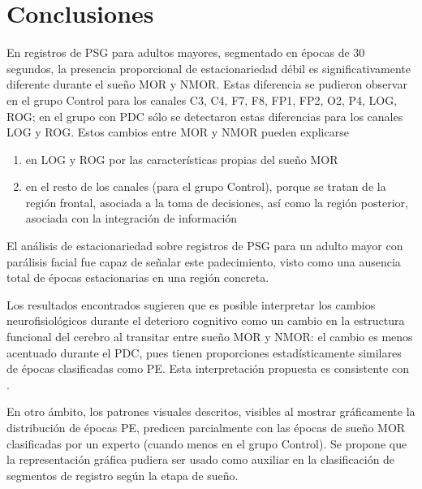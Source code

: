 \documentclass[12pt,a4paper]{mitthesis}
\begin{document}

\section{Conclusiones}

En registros de PSG para adultos mayores, segmentado en \'epocas de 30 segundos, la presencia 
proporcional de estacionariedad d\'ebil es significativamente diferente durante el sue\~no MOR y 
NMOR.
Estas diferencia se pudieron observar en el grupo Control para los canales C3, C4, F7, F8, FP1, 
FP2, O2, P4, LOG, ROG; en el grupo con PDC s\'olo se detectaron estas diferencias para los canales 
LOG y ROG.
Estos cambios entre MOR y NMOR pueden explicarse 
\begin{enumerate}
\item en LOG y ROG por las caracter\'isticas propias  del sue\~no MOR
\item en el resto de los canales (para el grupo Control), porque se tratan de la 
regi\'on frontal, asociada a la toma de decisiones, as\'i como la regi\'on posterior, 
asociada con la integraci\'on
de informaci\'on
\end{enumerate}

El an\'alisis de estacionariedad sobre registros de PSG para un adulto mayor con par\'alisis facial 
fue capaz de se\~nalar este padecimiento, visto como una ausencia total de \'epocas estacionarias
en una regi\'on concreta.

Los resultados encontrados sugieren que es posible interpretar los cambios neurofisiol\'ogicos 
durante el deterioro cognitivo como un cambio en la estructura funcional del cerebro al transitar 
entre sue\~no MOR y NMOR: el cambio es menos acentuado durante el PDC, pues tienen proporciones 
estad\'isticamente similares de \'epocas clasificadas como PE.
Esta interpretaci\'on propuesta es consistente con \cite{Valeria}.

En otro \'ambito, los patrones visuales descritos, visibles al mostrar gr\'aficamente la 
distribuci\'on de \'epocas PE, predicen parcialmente con las \'epocas de sue\~no MOR clasificadas 
por un experto (cuando menos en el grupo Control).
Se propone que la representaci\'on gr\'afica pudiera ser usado como auxiliar en la clasificaci\'on 
de segmentos de registro seg\'un la etapa de sue\~no.
\end{document}
